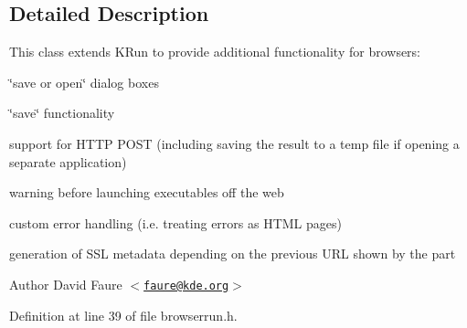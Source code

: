 \subsection{\-Detailed \-Description}
\-This class extends \-K\-Run to provide additional functionality for browsers\-:
\begin{DoxyItemize}
\item \char`\"{}save or open\char`\"{} dialog boxes
\item \char`\"{}save\char`\"{} functionality
\item support for \-H\-T\-T\-P \-P\-O\-S\-T (including saving the result to a temp file if opening a separate application)
\item warning before launching executables off the web
\item custom error handling (i.\-e. treating errors as \-H\-T\-M\-L pages)
\item generation of \-S\-S\-L metadata depending on the previous \-U\-R\-L shown by the part \begin{DoxyAuthor}{\-Author}
\-David \-Faure $<$\href{mailto:faure@kde.org}{\tt faure@kde.\-org}$>$ 
\end{DoxyAuthor}

\end{DoxyItemize}

\-Definition at line 39 of file browserrun.\-h.



